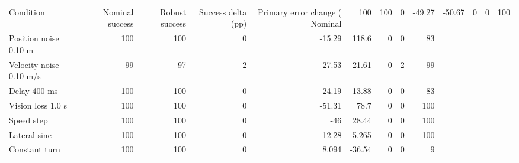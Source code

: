 \begin{tabular}{lrrrrrrrr}
\toprule
Condition & Nominal success & Robust success & Success delta (pp) & Primary error change (%
\midrule
Nominal & 100 & 100 & 0 & -49.27 & -50.67 & 0 & 0 & 100 \\
Position noise 0.10 m & 100 & 100 & 0 & -15.29 & 118.6 & 0 & 0 & 83 \\
Velocity noise 0.10 m/s & 99 & 97 & -2 & -27.53 & 21.61 & 0 & 2 & 99 \\
Delay 400 ms & 100 & 100 & 0 & -24.19 & -13.88 & 0 & 0 & 83 \\
Vision loss 1.0 s & 100 & 100 & 0 & -51.31 & 78.7 & 0 & 0 & 100 \\
Speed step & 100 & 100 & 0 & -46 & 28.44 & 0 & 0 & 100 \\
Lateral sine & 100 & 100 & 0 & -12.28 & 5.265 & 0 & 0 & 100 \\
Constant turn & 100 & 100 & 0 & 8.094 & -36.54 & 0 & 0 & 9 \\
\bottomrule
\end{tabular}
